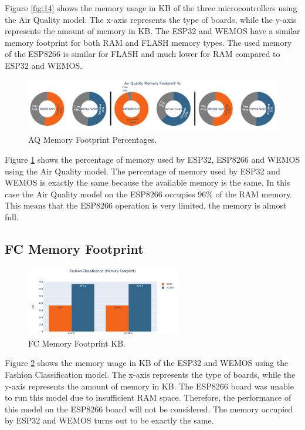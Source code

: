 \documentclass{article}
\begin{document}
Figure \ref{fig:14} shows the memory usage in KB of the three microcontrollers using the Air Quality model. The x-axis represents the type of boards, while the y-axis represents the amount of memory in KB. The ESP32 and WEMOS have a similar memory footprint for both RAM and FLASH memory types. The used memory of the ESP8266 is similar for FLASH and much lower for RAM compared to ESP32 and WEMOS.

\begin{figure}[H]
    \centering
    \includegraphics[width=1.0\textwidth]{AQ-Mem-perc.png}
    \caption{AQ Memory Footprint Percentages.}
    \label{fig:15}
\end{figure}

Figure \ref{fig:15} shows the percentage of memory used by ESP32, ESP8266 and WEMOS using the Air Quality model. The percentage of memory used by ESP32 and WEMOS is exactly the same because the available memory is the same. In this case the Air Quality model on the ESP8266 occupies 96\% of the RAM memory. This means that the ESP8266 operation is very limited, the memory is almost full.

\subsection{FC Memory Footprint}

\begin{figure}[H]
    \centering
    \includegraphics[width=0.6\textwidth]{FC-Mem-KB.png}
    \caption{FC Memory Footprint KB.}
    \label{fig:16}
\end{figure}

Figure \ref{fig:16} shows the memory usage in KB of the ESP32 and WEMOS using the Fashion Classification model. The x-axis represents the type of boards, while the y-axis represents the amount of memory in KB. The ESP8266 board was unable to run this model due to insufficient RAM space. Therefore, the performance of this model on the ESP8266 board will not be considered. The memory occupied by ESP32 and WEMOS turns out to be exactly the same.
\end{document}
